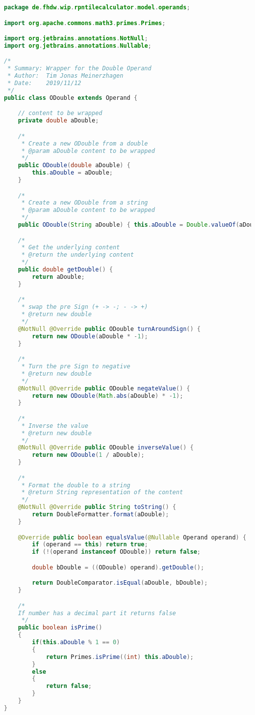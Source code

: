 \begin{lstlisting}[caption=ODouble (Meinerzhagen),label=list:ODouble,language=Java]
package de.fhdw.wip.rpntilecalculator.model.operands;

import org.apache.commons.math3.primes.Primes;

import org.jetbrains.annotations.NotNull;
import org.jetbrains.annotations.Nullable;

/*
 * Summary: Wrapper for the Double Operand
 * Author:  Tim Jonas Meinerzhagen
 * Date:    2019/11/12
 */
public class ODouble extends Operand {

    // content to be wrapped
    private double aDouble;

    /*
     * Create a new ODouble from a double
     * @param aDouble content to be wrapped
     */
    public ODouble(double aDouble) {
        this.aDouble = aDouble;
    }

    /*
     * Create a new ODouble from a string
     * @param aDouble content to be wrapped
     */
    public ODouble(String aDouble) { this.aDouble = Double.valueOf(aDouble); }

    /*
     * Get the underlying content
     * @return the underlying content
     */
    public double getDouble() {
        return aDouble;
    }

    /*
     * swap the pre Sign (+ -> -; - -> +)
     * @return new double
     */
    @NotNull @Override public ODouble turnAroundSign() {
        return new ODouble(aDouble * -1);
    }

    /*
     * Turn the pre Sign to negative
     * @return new double
     */
    @NotNull @Override public ODouble negateValue() {
        return new ODouble(Math.abs(aDouble) * -1);
    }

    /*
     * Inverse the value
     * @return new double
     */
    @NotNull @Override public ODouble inverseValue() {
        return new ODouble(1 / aDouble);
    }

    /*
     * Format the double to a string
     * @return String representation of the content
     */
    @NotNull @Override public String toString() {
        return DoubleFormatter.format(aDouble);
    }

    @Override public boolean equalsValue(@Nullable Operand operand) {
        if (operand == this) return true;
        if (!(operand instanceof ODouble)) return false;

        double bDouble = ((ODouble) operand).getDouble();

        return DoubleComparator.isEqual(aDouble, bDouble);
    }

    /*
    If number has a decimal part it returns false
     */
    public boolean isPrime()
    {
        if(this.aDouble % 1 == 0)
        {
            return Primes.isPrime((int) this.aDouble);
        }
        else
        {
            return false;
        }
    }
}
\end{lstlisting}    

